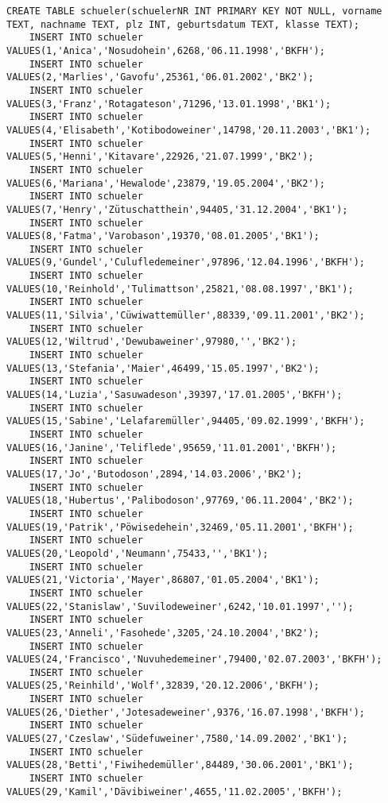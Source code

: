 \begin{lstlisting}[breaklines=True, numbers=none, basicstyle=\tiny, keepspaces=false]
	CREATE TABLE schueler(schuelerNR INT PRIMARY KEY NOT NULL, vorname TEXT, nachname TEXT, plz INT, geburtsdatum TEXT, klasse TEXT);
	INSERT INTO schueler VALUES(1,'Anica','Nosudohein',6268,'06.11.1998','BKFH');
	INSERT INTO schueler VALUES(2,'Marlies','Gavofu',25361,'06.01.2002','BK2');
	INSERT INTO schueler VALUES(3,'Franz','Rotagateson',71296,'13.01.1998','BK1');
	INSERT INTO schueler VALUES(4,'Elisabeth','Kotibodoweiner',14798,'20.11.2003','BK1');
	INSERT INTO schueler VALUES(5,'Henni','Kitavare',22926,'21.07.1999','BK2');
	INSERT INTO schueler VALUES(6,'Mariana','Hewalode',23879,'19.05.2004','BK2');
	INSERT INTO schueler VALUES(7,'Henry','Zütuschatthein',94405,'31.12.2004','BK1');
	INSERT INTO schueler VALUES(8,'Fatma','Varobason',19370,'08.01.2005','BK1');
	INSERT INTO schueler VALUES(9,'Gundel','Culufledemeiner',97896,'12.04.1996','BKFH');
	INSERT INTO schueler VALUES(10,'Reinhold','Tulimattson',25821,'08.08.1997','BK1');
	INSERT INTO schueler VALUES(11,'Silvia','Cüwiwattemüller',88339,'09.11.2001','BK2');
	INSERT INTO schueler VALUES(12,'Wiltrud','Dewubaweiner',97980,'','BK2');
	INSERT INTO schueler VALUES(13,'Stefania','Maier',46499,'15.05.1997','BK2');
	INSERT INTO schueler VALUES(14,'Luzia','Sasuwadeson',39397,'17.01.2005','BKFH');
	INSERT INTO schueler VALUES(15,'Sabine','Lelafaremüller',94405,'09.02.1999','BKFH');
	INSERT INTO schueler VALUES(16,'Janine','Teliflede',95659,'11.01.2001','BKFH');
	INSERT INTO schueler VALUES(17,'Jo','Butodoson',2894,'14.03.2006','BK2');
	INSERT INTO schueler VALUES(18,'Hubertus','Palibodoson',97769,'06.11.2004','BK2');
	INSERT INTO schueler VALUES(19,'Patrik','Pöwisedehein',32469,'05.11.2001','BKFH');
	INSERT INTO schueler VALUES(20,'Leopold','Neumann',75433,'','BK1');
	INSERT INTO schueler VALUES(21,'Victoria','Mayer',86807,'01.05.2004','BK1');
	INSERT INTO schueler VALUES(22,'Stanislaw','Suvilodeweiner',6242,'10.01.1997','');
	INSERT INTO schueler VALUES(23,'Anneli','Fasohede',3205,'24.10.2004','BK2');
	INSERT INTO schueler VALUES(24,'Francisco','Nuvuhedemeiner',79400,'02.07.2003','BKFH');
	INSERT INTO schueler VALUES(25,'Reinhild','Wolf',32839,'20.12.2006','BKFH');
	INSERT INTO schueler VALUES(26,'Diether','Jotesadeweiner',9376,'16.07.1998','BKFH');
	INSERT INTO schueler VALUES(27,'Czeslaw','Südefuweiner',7580,'14.09.2002','BK1');
	INSERT INTO schueler VALUES(28,'Betti','Fiwihedemüller',84489,'30.06.2001','BK1');
	INSERT INTO schueler VALUES(29,'Kamil','Dävibiweiner',4655,'11.02.2005','BKFH');

\end{lstlisting}
